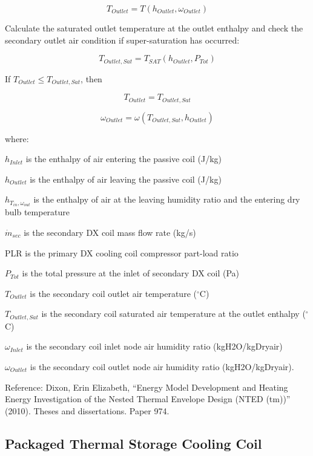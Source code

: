 \begin{equation}
  T_{Outlet} = T( h_{Outlet}, \omega_{Outlet} )
\end{equation}

Calculate the saturated outlet temperature at the outlet enthalpy and check the secondary outlet air condition if super-saturation has occurred:

\begin{equation}
  T_{Outlet, Sat} = T_{SAT}\left(h_{Outlet}, P_{Tot}\right)
\end{equation}

If \(T_{Outlet} \leq T_{Outlet, Sat}\), then

\begin{equation}
  T_{Outlet} = T_{Outlet, Sat}
\end{equation}

\begin{equation}
  \omega_{Outlet} = \omega\left(T_{Outlet,Sat},h_{Outlet}\right)
\end{equation}

where:

\(h_{Inlet}\) is the enthalpy of air entering the passive coil (J/kg)

\(h_{Outlet}\) is the enthalpy of air leaving the passive coil (J/kg)

\(h_{T_{in},\omega_{out}}\) is the enthalpy of air at the leaving humidity ratio and the entering dry bulb temperature

\(\dot{m}_{sec}\) is the secondary DX coil mass flow rate (kg/s)

PLR is the primary DX cooling coil compressor part-load ratio

\(P_{Tot}\) is the total pressure at the inlet of secondary DX coil (Pa)

\(T_{Outlet}\) is the secondary coil outlet air temperature (\(^{\circ}\)C)

\(T_{Outlet,Sat}\) is the secondary coil saturated air temperature at the outlet enthalpy (\(^{\circ}\)C)

\(\omega_{Inlet}\) is the secondary coil inlet node air humidity ratio (kgH2O/kgDryair)

\(\omega_{Outlet}\) is the secondary coil outlet node air humidity ratio (kgH2O/kgDryair).

Reference: Dixon, Erin Elizabeth, ``Energy Model Development and Heating Energy Investigation of the Nested Thermal Envelope Design (NTED (tm))'' (2010). Theses and dissertations. Paper 974.

\subsection{Packaged Thermal Storage Cooling Coil}\label{packaged-thermal-storage-cooling-coil}

